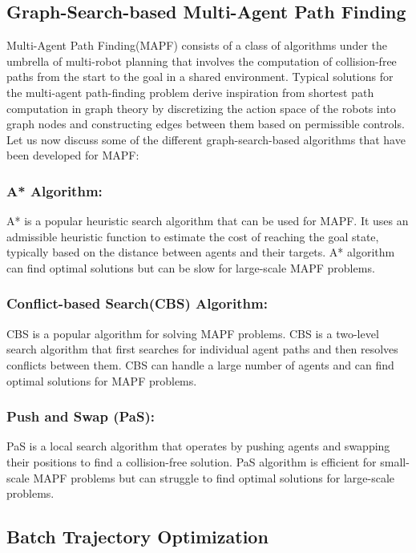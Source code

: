 \subsection{Graph-Search-based Multi-Agent Path Finding}\label{sec:MAPF}

Multi-Agent Path Finding(MAPF) consists of a class of algorithms under the umbrella of multi-robot planning that involves the computation of collision-free paths from the start to the goal in a shared environment. Typical solutions for the multi-agent path-finding problem derive inspiration from shortest path computation in graph theory by discretizing the action space of the robots into graph nodes and constructing edges between them based on permissible controls. Let us now discuss some of the different graph-search-based algorithms that have been developed for MAPF:

\subsubsection{A* Algorithm:}\label{sec:A*}
A*\cite{A*} is a popular heuristic search algorithm that can be used for MAPF. It uses an admissible heuristic function to estimate the cost of reaching the goal state, typically based on the distance between agents and their targets. A* algorithm can find optimal solutions but can be slow for large-scale MAPF problems.

\subsubsection{Conflict-based Search(CBS) Algorithm:}
CBS\cite{CBS} is a popular algorithm for solving MAPF problems. CBS is a two-level search algorithm that first searches for individual agent paths and then resolves conflicts between them. CBS can handle a large number of agents and can find optimal solutions for MAPF problems.


\subsubsection{Push and Swap (PaS):}
PaS\cite{PaS} is a local search algorithm that operates by pushing agents and swapping their positions to find a collision-free solution. PaS algorithm is efficient for small-scale MAPF problems but can struggle to find optimal solutions for large-scale problems.

\subsection{Batch Trajectory Optimization}

